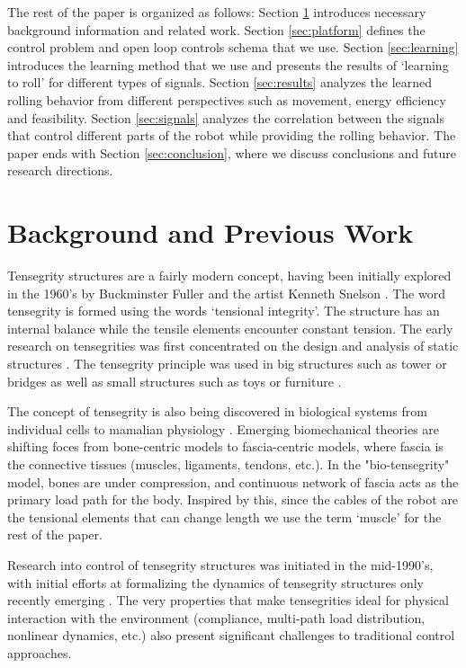 \documentclass[twocolumn,10pt]{asme2ej}
\begin{document}
The rest of the paper is organized as follows: Section \ref{sec:background} introduces necessary background information and related work. Section \ref{sec:platform} defines the control problem and open loop controls schema that we use. Section \ref{sec:learning} introduces the learning method that we use and presents the results of `learning to roll' for different types of signals. Section \ref{sec:results} analyzes the learned rolling behavior from different perspectives such as movement, energy efficiency and feasibility. Section \ref{sec:signals} analyzes the correlation between the signals that control different parts of the robot while providing the rolling behavior. The paper ends with Section \ref{sec:conclusion}, where we discuss conclusions and  future research directions.

\section{Background and Previous Work}
\label{sec:background}

Tensegrity structures are a fairly modern concept, having been initially explored in the 1960's by Buckminster Fuller \cite{Fuller_Tensegrity} and the artist Kenneth Snelson \cite{Snelson_patent}.  The word tensegrity is formed using the words `tensional integrity'. The structure has an internal balance while the tensile elements encounter constant tension. The early research on tensegrities was first concentrated on the design and analysis of static structures \cite{Skelton2009,BelHadjAli2010a,Juan2008}. The tensegrity principle was used in big structures such as tower or bridges as well as small structures such as toys or furniture \cite{tensegrity_tower}.

The concept of tensegrity is also being discovered in biological systems from individual cells to mamalian physiology \cite{ingber,tensegrity_spine}. Emerging biomechanical theories are shifting foces from bone-centric models to fascia-centric models, where fascia is the connective tissues (muscles, ligaments, tendons, etc.). In the "bio-tensegrity" model, bones are under compression, and continuous network of fascia acts as the primary load path for the body. Inspired by this, since the cables of the robot are the tensional elements that can change length  we use the term `muscle' for the rest of the paper.


Research into control of tensegrity structures was initiated in the mid-1990's, with initial efforts at formalizing the dynamics of tensegrity structures only recently emerging \cite{Skelton2009,motro2003tensegrity,wroldsen2006discussion}. The very properties that make tensegrities ideal for physical interaction with the environment (compliance, multi-path load distribution, nonlinear dynamics, etc.) also present significant challenges to traditional control approaches. 
\end{document}
